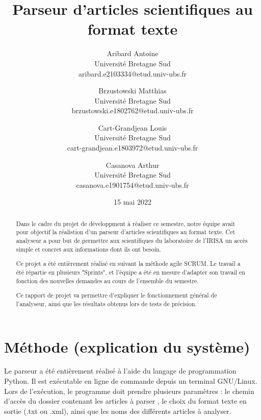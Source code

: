 \documentclass[11pt,a4paper]{article}
\begin{document}
 



\title{Parseur d'articles scientifiques au format texte}
\date{15 mai 2022}


\author{
{Aribard Antoine}\\
{Université Bretagne Sud}\\
{aribard.e2103334@etud.univ-ubs.fr}\\
\and
{Brzustowski Matthias}\\
{Université Bretagne Sud}\\
{brzustowski.e1802762@etud.univ-ubs.fr}\\
\and
{Cart-Grandjean Louis}\\
{Université Bretagne Sud}\\
{cart-grandjean.e1803972@etud.univ-ubs.fr}\\
\and
{Casanova Arthur}\\
{Université Bretagne Sud}\\
{casanova.e1901754@etud.univ-ubs.fr}\\
}


\maketitle


\begin{abstract} 
Dans le cadre du projet de développment à réaliser ce semestre, notre équipe avait pour objectif la réalistion d'un parseur d'articles scientifiques au format texte.
Cet analyseur a pour but de permettre aux scientifiques du laboratoire de l'IRISA un accès simple et concret aux informations dont ils ont besoin.

Ce projet a été entièrement réalisé en suivant la méthode agile SCRUM. Le travail a été répartie en plusieurs "Sprints", et l'équipe a été en mesure d'adapter son travail en fonction des nouvelles demandes au cours de l'ensemble du semestre.

Ce rapport de projet va permettre d'expliquer le fonctionnement général de l'analyseur, ainsi que les résultats obtenus lors de tests de précision.
\end{abstract}

\section{Méthode (explication du système)}
Le parseur a été entièrement réalisé à l'aide du langage de programmation Python. Il est exécutable en ligne de commande depuis un terminal GNU/Linux. Lors de l'exécution, le programme doit prendre plusieurs paramètres : le chemin d'accès du dossier contenant les articles à parser , le choix du format texte en sortie (.txt ou .xml), ainsi que les noms des différents articles à analyser.
\end{document}
